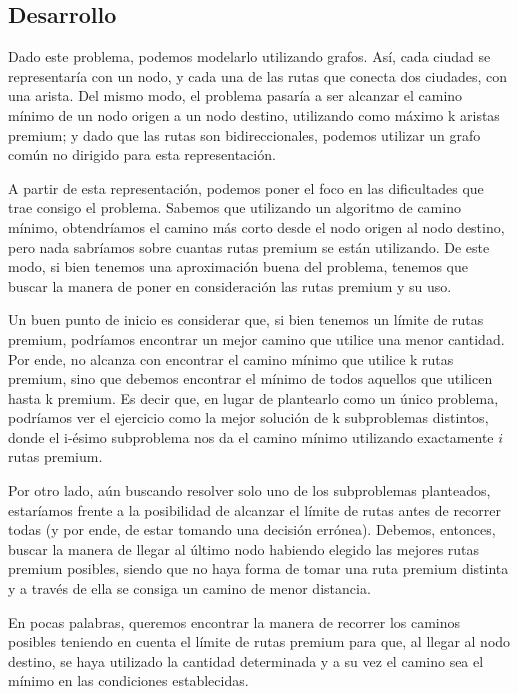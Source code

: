 \subsection{Desarrollo}
Dado este problema, podemos modelarlo utilizando grafos. Así, cada ciudad se representaría con un nodo, y cada una de las rutas que conecta dos ciudades, con una arista. Del mismo modo, el problema pasaría a ser alcanzar el camino mínimo de un nodo origen a un nodo destino, utilizando como máximo k aristas premium; y dado que las rutas son bidireccionales, podemos utilizar un grafo común no dirigido para esta representación.
\\
\par
A partir de esta representación, podemos poner el foco en las dificultades que trae consigo el problema. Sabemos que utilizando un algoritmo de camino mínimo, obtendríamos el camino más corto desde el nodo origen al nodo destino, pero nada sabríamos sobre cuantas rutas premium se están utilizando. De este modo, si bien tenemos una aproximación buena del problema, tenemos que buscar la manera de poner en consideración las rutas premium y su uso. 
\\
\par
Un buen punto de inicio es considerar que, si bien tenemos un límite de rutas premium, podríamos encontrar un mejor camino que utilice una menor cantidad. Por ende, no alcanza con encontrar el camino mínimo que utilice k rutas premium, sino que debemos encontrar el mínimo de todos aquellos que utilicen hasta k premium. Es decir que, en lugar de plantearlo como un único problema, podríamos ver el ejercicio como la mejor solución de k subproblemas distintos, donde el i-ésimo subproblema nos da el camino mínimo utilizando exactamente $i$ rutas premium.
\\
\par
Por otro lado, aún buscando resolver solo uno de los subproblemas planteados, estaríamos frente a la posibilidad de alcanzar el límite de rutas antes de recorrer todas (y por ende, de estar tomando una decisión errónea). Debemos, entonces, buscar la manera de llegar al último nodo habiendo elegido las mejores rutas premium posibles, siendo que no haya forma de tomar una ruta premium distinta y a través de ella se consiga un camino de menor distancia.
\\
\par
En pocas palabras, queremos encontrar la manera de recorrer los caminos posibles teniendo en cuenta el límite de rutas premium para que, al llegar al nodo destino, se haya utilizado la cantidad determinada y a su vez el camino sea el mínimo en las condiciones establecidas.
